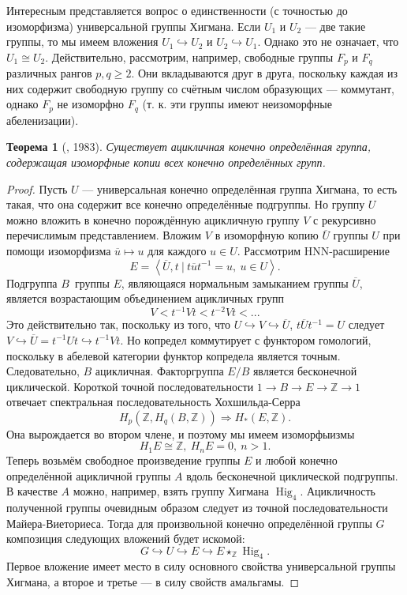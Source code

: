 \documentclass[14pt, dvipsnames]{extarticle}
\newtheorem{theorem}{Теорема}
\theoremstyle{definition}
\theoremstyle{remark}
\DeclareMathOperator{\Hig}{\mathrm{Hig}}
\begin{document}
Интересным представляется вопрос о единственности (с точностью до изоморфизма) универсальной группы Хигмана. Если $U_1$ и $U_2$ --- две такие группы, то мы имеем вложения $U_1\hookrightarrow U_2$ и $U_2\hookrightarrow U_1$. Однако это не означает, что $U_1\cong U_2$. Действительно, рассмотрим, например, свободные группы  $F_p$ и $F_q$ различных рангов $p, q\geqslant 2$. Они вкладываются друг в друга, поскольку каждая из них содержит свободную группу со счётным числом образующих --- коммутант, однако $F_p$ не изоморфно $F_q$ (т. к. эти группы имеют неизоморфные абеленизации).      


\begin{theorem}[\cite{BousfieldUniversal}, 1983]\label{BousfUniv}
Существует ацикличная конечно определённая группа, содержащая изоморфные копии всех конечно определённых групп.
\end{theorem}  

\begin{proof}

Пусть $U$ --- универсальная конечно определённая группа Хигмана, то есть такая, что она содержит все конечно определённые подгруппы. Но группу $U$ можно вложить в конечно порождённую ацикличную группу $V$ с рекурсивно перечислимым представлением. Вложим $V$ в изоморфную копию $\overline{U}$ группы $U$ при помощи изоморфизма $\overline{u}\mapsto u$ для каждого $u\in U$. Рассмотрим HNN-расширение $$E=\left \langle \overline{U}, t\ | \ t\overline{u}t^{-1} = u, \ u\in U  \right \rangle.$$ Подгруппа $B$ группы $E$, являющаяся нормальным замыканием группы $\overline{U}$, является возрастающим объединением ацикличных групп $$V < t^{-1} V t < t^{-2} V t < ...$$ Это действительно так, поскольку из того, что $U\hookrightarrow V\hookrightarrow \overline{U}$, $t\overline{U}t^{-1} = U$ следует $V\hookrightarrow \overline{U} = t^{-1}Ut\hookrightarrow t^{-1}Vt$. Но копредел коммутирует с функтором гомологий, поскольку в абелевой категории функтор копредела является точным. Следовательно, $B$ ацикличная. Факторгруппа $E/B$ является бесконечной циклической. Короткой точной последовательности $1\to B\to E\to \mathbb{Z}\to 1$ отвечает спектральная последовательность Хохшильда-Серра $$H_p(\mathbb{Z}, H_q(B, \mathbb{Z}))\Rightarrow H_\ast(E, \mathbb{Z}).$$ Она вырождается во втором члене, и поэтому мы имеем изоморфыизмы $$H_1E\cong\mathbb{Z},\ H_nE = 0, \ n > 1.$$ Теперь возьмём свободное произведение группы $E$ и любой конечно определённой ацикличной группы $A$ вдоль бесконечной циклической подгруппы. В качестве $A$ можно, например, взять группу Хигмана $\Hig_4$. Ацикличность полученной группы очевидным образом следует из точной последовательности Майера-Виеториеса. Тогда для произвольной конечно определённой группы $G$ композиция следующих вложений будет искомой: $$G\hookrightarrow U\hookrightarrow E\hookrightarrow E\star_{\mathbb{Z}}\Hig_4.$$ Первое вложение имеет место в силу основного свойства универсальной группы Хигмана, а второе и третье --- в силу свойств амальгамы.      

\end{proof}
\end{document}
